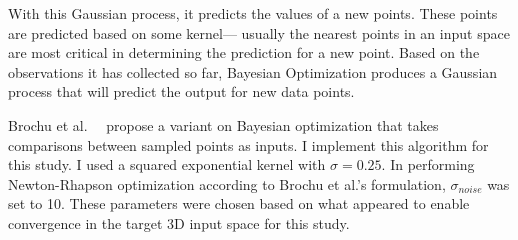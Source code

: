 With this Gaussian process, it predicts the values of a new points.
These points are predicted based on some kernel---
usually the nearest points in an input space are most critical in determining the prediction for a new point.
Based on the observations it has collected so far, Bayesian Optimization produces a Gaussian process that will predict the output for new data points.
\fi

Brochu et al.~\cite{brochu_tutorial_2010}~\cite{brochu_active_2008} propose a variant on Bayesian optimization that takes comparisons between sampled points as inputs.
I implement this algorithm for this study.
I used a squared exponential kernel with $\sigma = 0.25$.
In performing Newton-Rhapson optimization according to Brochu et al.'s formulation, $\sigma_{noise}$ was set to 10.
These parameters were chosen based on what appeared to enable convergence in the target 3D input space for this study.

